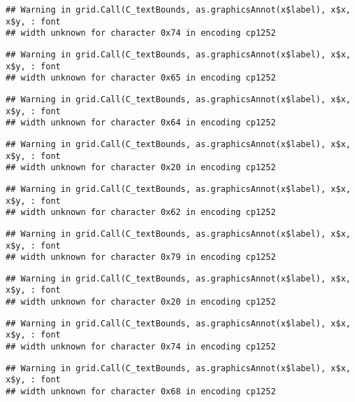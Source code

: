\documentclass[
]{article}
\begin{document}
\begin{verbatim}
## Warning in grid.Call(C_textBounds, as.graphicsAnnot(x$label), x$x, x$y, : font
## width unknown for character 0x74 in encoding cp1252
\end{verbatim}

\begin{verbatim}
## Warning in grid.Call(C_textBounds, as.graphicsAnnot(x$label), x$x, x$y, : font
## width unknown for character 0x65 in encoding cp1252
\end{verbatim}

\begin{verbatim}
## Warning in grid.Call(C_textBounds, as.graphicsAnnot(x$label), x$x, x$y, : font
## width unknown for character 0x64 in encoding cp1252
\end{verbatim}

\begin{verbatim}
## Warning in grid.Call(C_textBounds, as.graphicsAnnot(x$label), x$x, x$y, : font
## width unknown for character 0x20 in encoding cp1252
\end{verbatim}

\begin{verbatim}
## Warning in grid.Call(C_textBounds, as.graphicsAnnot(x$label), x$x, x$y, : font
## width unknown for character 0x62 in encoding cp1252
\end{verbatim}

\begin{verbatim}
## Warning in grid.Call(C_textBounds, as.graphicsAnnot(x$label), x$x, x$y, : font
## width unknown for character 0x79 in encoding cp1252
\end{verbatim}

\begin{verbatim}
## Warning in grid.Call(C_textBounds, as.graphicsAnnot(x$label), x$x, x$y, : font
## width unknown for character 0x20 in encoding cp1252
\end{verbatim}

\begin{verbatim}
## Warning in grid.Call(C_textBounds, as.graphicsAnnot(x$label), x$x, x$y, : font
## width unknown for character 0x74 in encoding cp1252
\end{verbatim}

\begin{verbatim}
## Warning in grid.Call(C_textBounds, as.graphicsAnnot(x$label), x$x, x$y, : font
## width unknown for character 0x68 in encoding cp1252
\end{verbatim}
\end{document}
